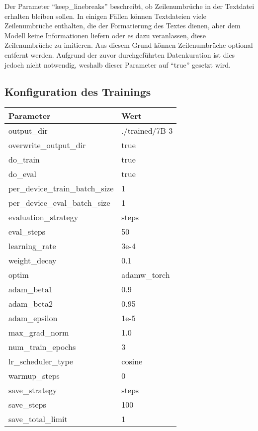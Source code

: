 Der Parameter \enquote{keep\_linebreaks} beschreibt, ob Zeilenumbrüche in der Textdatei erhalten bleiben sollen.
In einigen Fällen können Textdateien viele Zeilenumbrüche enthalten, die der Formatierung des Textes dienen, aber dem Modell keine Informationen liefern oder es dazu veranlassen, diese Zeilenumbrüche zu imitieren.
Aus diesem Grund können Zeilenumbrüche optional entfernt werden.
Aufgrund der zuvor durchgeführten Datenkuration ist dies jedoch nicht notwendig, weshalb dieser Parameter auf \enquote{true} gesetzt wird.\\

\subsection{Konfiguration des Trainings}\label{subsec:config-training}
\begin{table}
    \centering
    \begin{tabular}{ll}
        \toprule
        \textbf{Parameter} & \textbf{Wert} \\
        \midrule
        output\_dir & ./trained/7B-3 \\
        overwrite\_output\_dir & true \\
        do\_train & true \\
        do\_eval & true \\
        per\_device\_train\_batch\_size & 1 \\
        per\_device\_eval\_batch\_size & 1 \\
        evaluation\_strategy & steps \\
        eval\_steps & 50 \\
        learning\_rate & 3e-4 \\
        weight\_decay & 0.1 \\
        optim & adamw\_torch \\
        adam\_beta1 & 0.9 \\
        adam\_beta2 & 0.95 \\
        adam\_epsilon & 1e-5 \\
        max\_grad\_norm & 1.0 \\
        num\_train\_epochs & 3 \\
        lr\_scheduler\_type & cosine \\
        warmup\_steps & 0 \\
        save\_strategy & steps \\
        save\_steps & 100 \\
        save\_total\_limit & 1 \\

\end{tabular}
\end{table}
